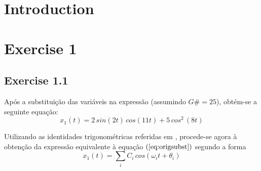 \documentclass[a4paper]{article}
\title{\documentTitle}
\author{\documentAuthors}
\begin{document}
\maketitle
\cleardoublepage

\tableofcontents
\cleardoublepage

\setlength{\parindent}{1cm}
\setlength{\parskip}{0.3cm}

\section{Introduction}

\clearpage

\section{Exercise 1}
\subsection{Exercise 1.1}
Após a substituição das variáveis na expressão (assumindo $G\# = 25$), obtém-se a seguinte equação:
\begin{equation}
	x_{1}(t) = 2 \, sin(2 t) \, cos(11 t) + 5 \, cos^2 \, (8t)
	\label{eq:origsubst}
\end{equation}

\noindent Utilizando as identidades trigonométricas referidas em \emph{}, procede-se agora à obtenção da expressão equivalente à equação $(\ref{eq:origsubst})$ segundo a forma
\begin{equation}
x_{1}(t) = \sum_{i} C_{i} \, cos(\omega_{i} t + \theta_{i})
\end{equation}
\end{document}
